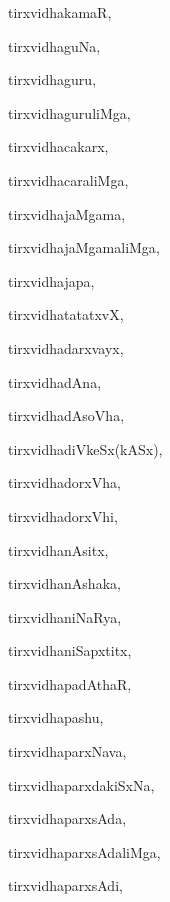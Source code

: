 \begin{multicols}{3}
{\noindent
{tirxvidhakamaR}, \pageref{tirxvidhakamaR}

\noindent
{tirxvidhaguNa}, \pageref{tirxvidhaguNa}

\noindent
{tirxvidhaguru}, \pageref{tirxvidhaguru}

\noindent
{tirxvidhaguruliMga}, \pageref{tirxvidhaguruliMga}

\noindent
{tirxvidhacakarx}, \pageref{tirxvidhacakarx}

\noindent
{tirxvidhacaraliMga}, \pageref{tirxvidhacaraliMga}

\noindent
{tirxvidhajaMgama}, \pageref{tirxvidhajaMgama}

\noindent
{tirxvidhajaMgamaliMga}, \pageref{tirxvidhajaMgamaliMga}

\noindent
{tirxvidhajapa}, \pageref{tirxvidhajapa}

\noindent
{tirxvidhatatatxvX}, \pageref{tirxvidhatatatxvX}

\noindent
{tirxvidhadarxvayx}, \pageref{tirxvidhadarxvayx}

\noindent
{tirxvidhadAna}, \pageref{tirxvidhadAna}

\noindent
{tirxvidhadAsoVha}, \pageref{tirxvidhadAsoVha}

\noindent
{tirxvidhadiVkeSx(kASx)}, \pageref{tirxvidhadiVkeSxkASx}

\noindent
{tirxvidhadorxVha}, \pageref{tirxvidhadorxVha}

\noindent
{tirxvidhadorxVhi}, \pageref{tirxvidhadorxVhi}

\noindent
{tirxvidhanAsitx}, \pageref{tirxvidhanAsitx}

\noindent
{tirxvidhanAshaka}, \pageref{tirxvidhanAshaka}

\noindent
{tirxvidhaniNaRya}, \pageref{tirxvidhaniNaRya}

\noindent
{tirxvidhaniSapxtitx}, \pageref{tirxvidhaniSapxtitx}

\noindent
{tirxvidhapadAthaR}, \pageref{tirxvidhapadAthaR}

\noindent
{tirxvidhapashu}, \pageref{tirxvidhapashu}

\noindent
{tirxvidhaparxNava}, \pageref{tirxvidhaparxNava}

\noindent
{tirxvidhaparxdakiSxNa}, \pageref{tirxvidhaparxdakiSxNa}

\noindent
{tirxvidhaparxsAda}, \pageref{tirxvidhaparxsAda}

\noindent
{tirxvidhaparxsAdaliMga}, \pageref{tirxvidhaparxsAdaliMga}

\noindent
{tirxvidhaparxsAdi}, \pageref{tirxvidhaparxsAdi}

}
\end{multicols}
